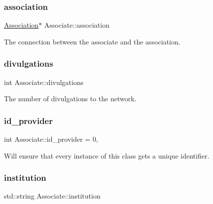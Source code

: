 \subsubsection{\texorpdfstring{association}{association}}
{\footnotesize\ttfamily \hyperlink{classAssociation}{Association}$\ast$ Associate\+::association\hspace{0.3cm}{\ttfamily [private]}}



The connection between the associate and the association. 

\mbox{\label{classAssociate_a5f697e757ce7e1be1ed4a2421679b804}} 
\subsubsection{\texorpdfstring{divulgations}{divulgations}}
{\footnotesize\ttfamily int Associate\+::divulgations\hspace{0.3cm}{\ttfamily [private]}}



The number of divulgations to the network. 

\mbox{\label{classAssociate_a9fcd0a229b70369a3f6beaf7a02fe58f}} 
\subsubsection{\texorpdfstring{id\+\_\+provider}{id\_provider}}
{\footnotesize\ttfamily int Associate\+::id\+\_\+provider = 0\hspace{0.3cm}{\ttfamily [static]}, {\ttfamily [private]}}



Will ensure that every instance of this class gets a unique identifier. 

\mbox{\label{classAssociate_a25b82eab07e159a91ebdc64fa4d656ab}} 
\subsubsection{\texorpdfstring{institution}{institution}}
{\footnotesize\ttfamily std\+::string Associate\+::institution\hspace{0.3cm}{\ttfamily [private]}}



